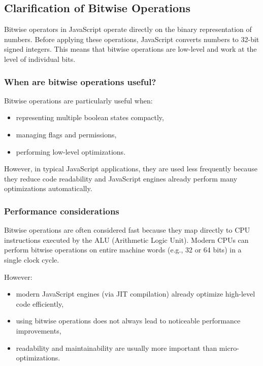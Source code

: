 \documentclass{scrbook}
\begin{document}
\subsection{Clarification of Bitwise Operations}

Bitwise operators in JavaScript operate directly on the binary representation of numbers. Before applying these operations, JavaScript converts numbers to 32-bit signed integers. This means that bitwise operations are low-level and work at the level of individual bits.

\subsubsection{When are bitwise operations useful?}

Bitwise operations are particularly useful when:
\begin{itemize}
    \item representing multiple boolean states compactly,
    \item managing flags and permissions,
    \item performing low-level optimizations.
\end{itemize}

However, in typical JavaScript applications, they are used less frequently because they reduce code readability and JavaScript engines already perform many optimizations automatically.

\subsubsection{Performance considerations}

Bitwise operations are often considered fast because they map directly to CPU instructions executed by the ALU (Arithmetic Logic Unit). Modern CPUs can perform bitwise operations on entire machine words (e.g., 32 or 64 bits) in a single clock cycle.

However:
\begin{itemize}
    \item modern JavaScript engines (via JIT compilation) already optimize high-level code efficiently,
    \item using bitwise operations does not always lead to noticeable performance improvements,
    \item readability and maintainability are usually more important than micro-optimizations.
\end{itemize}
\end{document}
